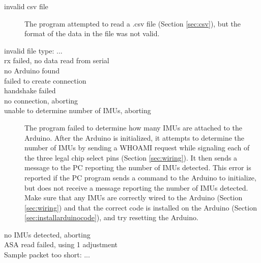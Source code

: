 \documentclass[11pt,letterpaper,article,oneside]{memoir}
\begin{document}
\begin{description}
\item[invalid csv file] The program attempted to read a .csv file (Section
\ref{sec:csv}), but the
format of the data in the file was not valid.

\item[invalid file type: ...]
\item[rx failed, no data read from serial]
\item[no Arduino found]
\item[failed to create connection]
\item[handshake failed]
\item[no connection, aborting]

\item[unable to determine number of IMUs, aborting] The program failed to
determine how many IMUs are attached to the Arduino. After the Arduino is
initialized, it attempts to determine the number of IMUs by sending a WHOAMI
request while signaling each of the three legal chip select pins (Section
\ref{sec:wiring}). It then sends a message to the PC reporting the number of
IMUs detected. This error is reported if the PC program sends a command to the
Arduino to initialize, but does not receive a message reporting the number of
IMUs detected. Make sure that any IMUs are correctly wired to the Arduino
(Section \ref{sec:wiring}) and that the correct code is installed on the Arduino
(Section \ref{sec:installarduinocode}), and try resetting the Arduino.

\item[no IMUs detected, aborting]

\item[ASA read failed, using 1 adjustment]

\item[Sample packet too short: ...]


\end{description}







%
%
\end{document}
